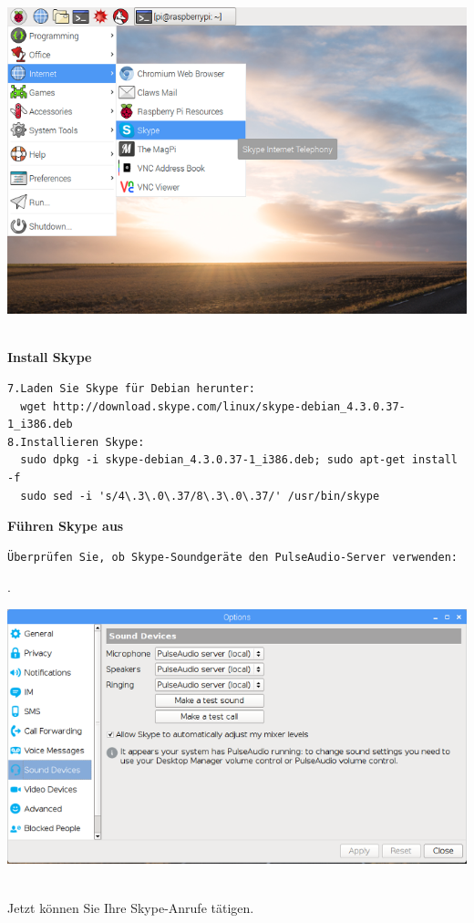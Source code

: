 \begin{minipage}{\textwidth}
    \begin{center}
        \includegraphics[scale=0.35]{img/skype.png} 
    \end{center}
\end{minipage}
\\

\textbf{Install Skype}
\begin{verbatim}
7.Laden Sie Skype für Debian herunter:
  wget http://download.skype.com/linux/skype-debian_4.3.0.37-1_i386.deb
8.Installieren Skype:
  sudo dpkg -i skype-debian_4.3.0.37-1_i386.deb; sudo apt-get install -f
  sudo sed -i 's/4\.3\.0\.37/8\.3\.0\.37/' /usr/bin/skype 
\end{verbatim}
\textbf{Führen Skype aus}
\begin{verbatim}
Überprüfen Sie, ob Skype-Soundgeräte den PulseAudio-Server verwenden:
\end{verbatim}. 
\begin{minipage}{\textwidth}
    \begin{center}        
        \includegraphics[scale=0.4]{img/skype-option.png} 
    \end{center}
\end{minipage}
\\

Jetzt können Sie Ihre Skype-Anrufe tätigen.
